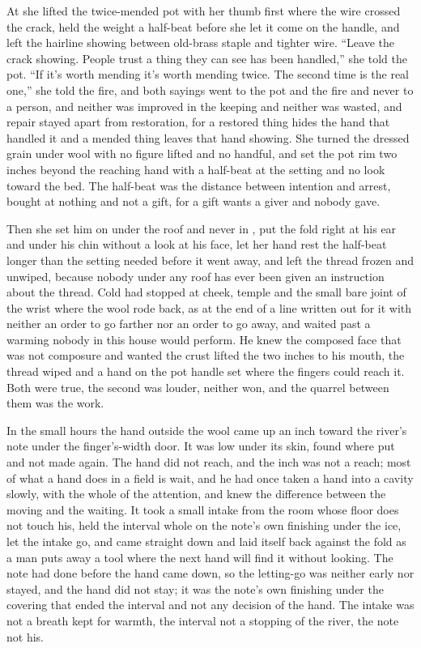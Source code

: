 At  she lifted the twice-mended pot with her thumb first where the wire crossed the crack, held the weight a half-beat before she let it come on the handle, and left the hairline showing between old-brass staple and tighter wire. “Leave the crack showing. People trust a thing they can see has been handled,” she told the pot. “If it's worth mending it's worth mending twice. The second time is the real one,” she told the fire, and both sayings went to the pot and the fire and never to a person, and neither was improved in the keeping and neither was wasted, and repair stayed apart from restoration, for a restored thing hides the hand that handled it and a mended thing leaves that hand showing. She turned the dressed grain under wool with no figure lifted and no handful, and set the pot rim two inches beyond the reaching hand with a half-beat at the setting and no look toward the bed. The half-beat was the distance between intention and arrest, bought at nothing and not a gift, for a gift wants a giver and nobody gave.

Then she set him on  under the roof and never in , put the fold right at his ear and under his chin without a look at his face, let her hand rest the half-beat longer than the setting needed before it went away, and left the thread frozen and unwiped, because nobody under any roof has ever been given an instruction about the thread. Cold had stopped at cheek, temple and the small bare joint of the wrist where the wool rode back, as at the end of a line written out for it with neither an order to go farther nor an order to go away, and  waited past a warming nobody in this house would perform. He knew the composed face that was not composure and wanted the crust lifted the two inches to his mouth, the thread wiped and a hand on the pot handle set where the fingers could reach it. Both were true, the second was louder, neither won, and the quarrel between them was the work.

In the small hours the hand outside the wool came up an inch toward the river's note under the finger's-width door. It was low under its skin, found where put and not made again. The hand did not reach, and the inch was not a reach; most of what a hand does in a field is wait, and he had once taken a hand into a cavity slowly, with the whole of the attention, and knew the difference between the moving and the waiting. It took a small intake from the room whose floor does not touch his, held the interval whole on the note's own finishing under the ice, let the intake go, and came straight down and laid itself back against the fold as a man puts away a tool where the next hand will find it without looking. The note had done before the hand came down, so the letting-go was neither early nor stayed, and the hand did not stay; it was the note's own finishing under the covering that ended the interval and not any decision of the hand. The intake was not a breath kept for warmth, the interval not a stopping of the river, the note not his.

